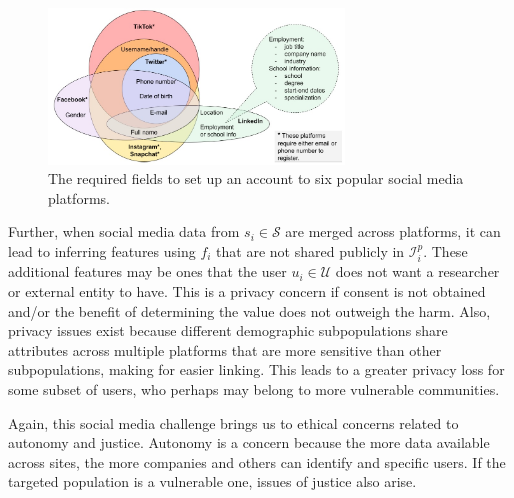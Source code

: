 \documentclass[11pt]{article} %
\begin{document}
\begin{figure}[tb]
    \centering
    \includegraphics[width=0.7\textwidth,natwidth=650,natheight=300]{figs/req_fields1.png}
    \caption{The required fields to set up an account to six popular social media platforms.}
    \label{fig:req_fields}
\end{figure}

Further, when social media data from $s_i \in \mathcal{S}$ are merged across platforms, it can lead to inferring features using $f_i$ that are not shared publicly in ${\mathcal{I}^p_i}$. These additional features may be ones that the user $u_i \in \mathcal{U}$ does not want a researcher or external entity to have. This is a privacy concern if consent is not obtained and/or the benefit of determining the value does not outweigh the harm. Also, privacy issues exist because different demographic subpopulations share attributes across multiple platforms that are more sensitive than other subpopulations, making for easier linking. This leads to a greater privacy loss for some subset of users, who perhaps may belong to more vulnerable communities.

Again, this social media challenge brings us to ethical concerns related to autonomy and justice. 
Autonomy is a concern because the more data available across sites, the more companies and others can identify and specific users. If the targeted population is a vulnerable one, issues of justice also arise. 
\end{document}
